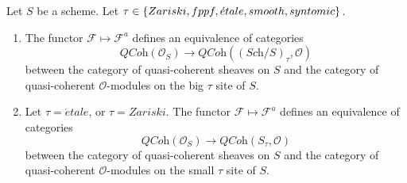 \begin{proposition}
\label{proposition-equivalence-quasi-coherent}
Let $S$ be a scheme.
Let $\tau \in \{Zariski,\linebreak[0] fppf,\linebreak[0]
\acute{e}tale,\linebreak[0] smooth,\linebreak[0] syntomic\}$.
\begin{enumerate}
\item The functor $\mathcal{F} \mapsto \mathcal{F}^a$
defines an equivalence of categories
$$
\textit{QCoh}(\mathcal{O}_S)
\longrightarrow 
\textit{QCoh}((\textit{Sch}/S)_\tau, \mathcal{O})
$$
between the category of quasi-coherent sheaves on $S$ and the category
of quasi-coherent $\mathcal{O}$-modules on the big $\tau$ site of $S$.
\item Let $\tau = \acute{e}tale$, or $\tau = Zariski$.
The functor $\mathcal{F} \mapsto \mathcal{F}^a$
defines an equivalence of categories
$$
\textit{QCoh}(\mathcal{O}_S)
\longrightarrow 
\textit{QCoh}(S_\tau, \mathcal{O})
$$
between the category of quasi-coherent sheaves on $S$ and the category
of quasi-coherent $\mathcal{O}$-modules on the small $\tau$ site of $S$.
\end{enumerate}
\end{proposition}

